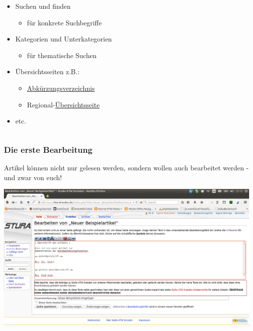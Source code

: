 \documentclass{beamer}
\begin{document}
\begin{frame}
\begin{columns}
    \begin{column}{0.7\linewidth}
      \begin{itemize}[<+->]
      \item Suchen und finden
        \begin{itemize}
        \item für konkrete Suchbegriffe
        \end{itemize}
      \item Kategorien und Unterkategorien
        \begin{itemize}
        \item für thematische Suchen
        \end{itemize}
      \item Übersichtsseiten z.B.:
        \begin{itemize}
        \item \href{http://wiki.stura.htw-dresden.de/index.php/Kategorie:Abk\%C3\%BCrzung}{Abkürzungsverzeichnis}
        \item Regional-\href{http://food.the-empire.de/index.php/Hauptseite}{Übersichtsseite}
        \end{itemize}
      \item etc.
      \end{itemize}
    \end{column}
  
  \end{columns}
  
\end{frame}


\begin{frame}
  \frametitle{Die erste Bearbeitung}

  Artikel können nicht nur gelesen werden, sondern wollen auch bearbeitet
  werden - und zwar von euch!

  \begin{center}
    \includegraphics[width=1\linewidth]{Wikiartikel_bearbeiten}
  \end{center}
\end{frame}
\end{document}
